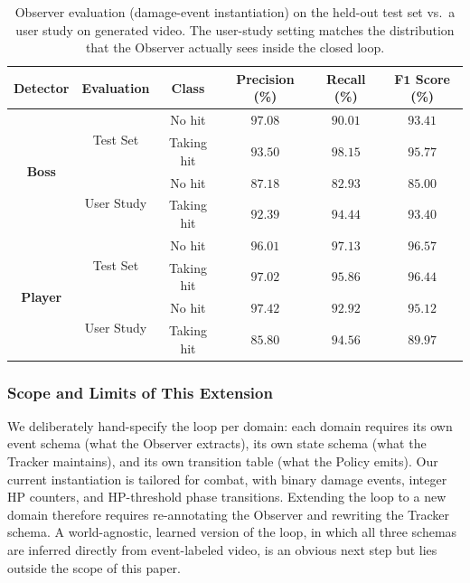 \begin{table}[t]
\centering
\caption{Observer evaluation (damage-event instantiation) on the held-out test set vs.\ a user study on generated video. The user-study setting matches the distribution that the Observer actually sees inside the closed loop.}
\label{tab:hit_detection_eval}
\begin{tabular}{@{}cccccc@{}}
\toprule
\textbf{Detector} & \textbf{Evaluation} & \textbf{Class} & \textbf{Precision (\%)} & \textbf{Recall (\%)} & \textbf{F$\mathbf{1}$ Score (\%)} \\ \midrule
\multirow{4}{*}{\textbf{Boss}} & \multirow{2}{*}{Test Set} & No hit     & $97.08$ & $90.01$ & $93.41$ \\
                               &                            & Taking hit & $93.50$ & $98.15$ & $95.77$ \\ \cmidrule(l){2-6} 
                               & \multirow{2}{*}{User Study}& No hit     & $87.18$ & $82.93$ & $85.00$ \\
                               &                            & Taking hit & $92.39$ & $94.44$ & $93.40$ \\ \midrule
\multirow{4}{*}{\textbf{Player}} & \multirow{2}{*}{Test Set} & No hit     & $96.01$ & $97.13$ & $96.57$ \\
                                 &                            & Taking hit & $97.02$ & $95.86$ & $96.44$ \\ \cmidrule(l){2-6} 
                                 & \multirow{2}{*}{User Study}& No hit     & $97.42$ & $92.92$ & $95.12$ \\
                                 &                            & Taking hit & $85.80$ & $94.56$ & $89.97$ \\ \bottomrule
\end{tabular}
\end{table}

\subsubsection{Scope and Limits of This Extension}
\label{app:otp_scope}

We deliberately hand-specify the loop per domain: each domain requires its own event schema (what the Observer extracts), its own state schema (what the Tracker maintains), and its own transition table (what the Policy emits). Our current instantiation is tailored for combat, with binary damage events, integer HP counters, and HP-threshold phase transitions. Extending the loop to a new domain therefore requires re-annotating the Observer and rewriting the Tracker schema. A world-agnostic, learned version of the loop, in which all three schemas are inferred directly from event-labeled video, is an obvious next step but lies outside the scope of this paper.

